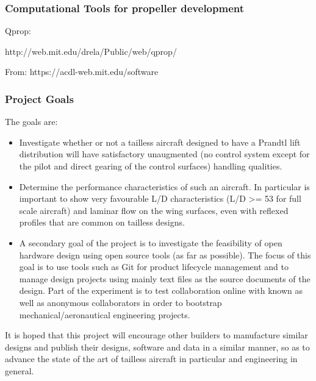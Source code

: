 \documentclass{beamer}
\begin{document}
\begin{frame}
\frametitle{Computational Tools for propeller development}

Qprop:

http://web.mit.edu/drela/Public/web/qprop/  

From:
https://acdl-web.mit.edu/software


\end{frame}


\begin{frame}
\frametitle{Project Goals}

The goals are:

\begin{itemize}
\item Investigate whether or not a tailless aircraft designed to have a Prandtl lift distribution will have satisfactory unaugmented (no control system except for the pilot and direct gearing of the control surfaces) handling qualities.
\item Determine the performance characteristics of such an aircraft.  In particular is important to show very favourable L/D characteristics (L/D >= 53 for full scale aircraft) and laminar flow on the wing surfaces, even with reflexed profiles that are common on tailless designs.
\item A secondary goal of the project is to investigate the feasibility of open hardware design using open source tools (as far as possible).  The focus of this goal is to use tools such as Git for product lifecycle management and to manage design projects using mainly text files as the source documents of the design.  Part of the experiment is to test collaboration online with known as well as anonymous collaborators in order to bootstrap mechanical/aeronautical engineering projects.
\end{itemize}

It is hoped that this project will encourage other builders to manufacture similar designs and publish their designs, software and 
data in a similar manner, so as to advance the state of the art of tailless aircraft in particular and engineering in general.

\end{frame}
\end{document}
